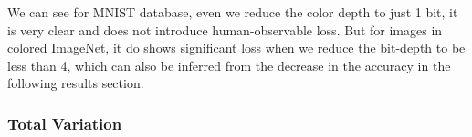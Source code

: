 We can see for MNIST database, even we reduce the color depth to just 1 bit, it is very clear and does not introduce human-observable loss. But for images in colored ImageNet, it do shows significant loss when we reduce the bit-depth to be less than 4, which can also be inferred from the decrease in the accuracy in the following results section. 

\subsubsection{Total Variation}

